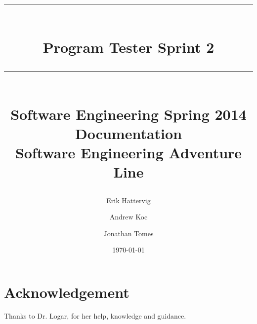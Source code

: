 \documentclass{book}
\title{{\color{MSBlue1} \rule{\linewidth}{0.5mm}}\\[2mm] {\huge \bfseries \color{MSBlue1} Program Tester Sprint 2 }\\[-1mm] {\color{MSBlue1}\rule{\linewidth}{0.5mm}} \\  \vfill
{\LARGE \bfseries \color{MSBlue2} Software Engineering Spring 2014  Documentation }\\  \vfill 
{\color{MSBlue1} Software Engineering Adventure Line} }
\author{\color{MSBlue1}  Erik Hattervig \and \color{MSBlue1} Andrew Koc \and  \color{MSBlue1} Jonathan Tomes }
\date{\color{MSBlue1} \today}
\begin{document}
\frontmatter
\maketitle


\tableofcontents
\listoffigures
\listoftables
\listofalgorithms




 
\mainmatter













\backmatter
\chapter{Acknowledgement}
\label{SpecialThanks}  Thanks to Dr. Logar, for her help, knowledge and guidance.


\setcounter{section}{0}


\end{document}
